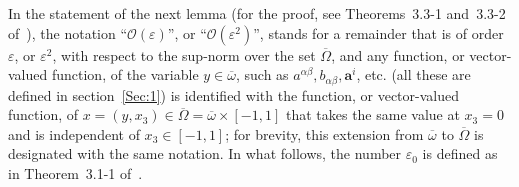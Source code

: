 \documentclass{amsart}
\begin{document}
In the statement of the next lemma (for the proof, see Theorems~3.3-1 and~3.3-2 of~\cite{Ciarlet2000}), the notation ``$\mathcal{O}(\varepsilon)$'', or ``$\mathcal{O}(\varepsilon^2)$'', stands for a remainder that is of order $\varepsilon$, or $\varepsilon^2$, with respect to the sup-norm over the set $\overline{\Omega}$, and any function, or vector-valued function, of the variable $y \in \overline{\omega}$, such as $a^{\alpha\beta}, b_{\alpha\beta}, \bm{a}^i$, etc. (all these are defined in section~\ref{Sec:1}) is identified with the function, or vector-valued function, of $x = (y, x_3) \in \overline{\Omega} = \overline{\omega} \times [-1,1]$ that takes the same value at $x_3 = 0$ and is independent of $x_3 \in \left[-1, 1\right]$; for brevity, this extension from $\overline{\omega} $ to $\overline{\Omega}$ is designated with the same notation. In what follows, the number $\varepsilon_0$ is defined as in Theorem~3.1-1 of~\cite{Ciarlet2000}.
\end{document}
